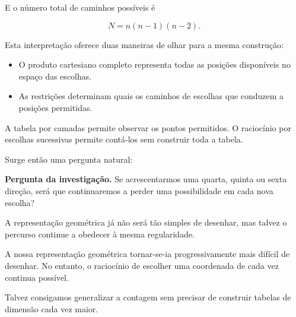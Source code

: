 \documentclass[11pt,a4paper,oneside]{book}
\newcommand{\Pergunta}[1]{\begin{perguntabox}\textbf{Pergunta da investigação.} #1\end{perguntabox}}
\begin{document}
E o número total de caminhos possíveis é

\[
N=n(n-1)(n-2).
\]

Esta interpretação oferece duas maneiras de olhar
para a mesma construção:

\begin{itemize}
    \item O produto cartesiano completo representa
    todas as posições disponíveis no espaço
    das escolhas.

    \item As restrições determinam quais os
    caminhos de escolhas que conduzem a
    posições permitidas.
\end{itemize}

A tabela por camadas permite observar os pontos
permitidos. O raciocínio por escolhas sucessivas
permite contá-los sem construir toda a tabela.

\medskip

Surge então uma pergunta natural:

\Pergunta{Se acrescentarmos uma quarta, quinta ou
sexta direção, será que continuaremos a perder
uma possibilidade em cada nova escolha?}

A representação geométrica já não será tão simples
de desenhar, mas talvez o percurso continue a
obedecer à mesma regularidade.


A nossa representação geométrica tornar-se-ia
progressivamente mais difícil de desenhar.
No entanto, o raciocínio de escolher uma
coordenada de cada vez continua possível.

Talvez consigamos generalizar a contagem sem
precisar de construir tabelas de dimensão
cada vez maior.
\end{document}
